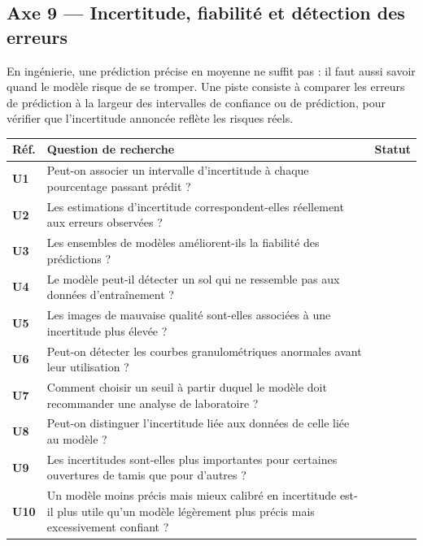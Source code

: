 \documentclass[11pt,a4paper]{article}
\makeatletter
\newenvironment{qtable}{%
  \par\smallskip
  \begin{longtable}{@{}>{\bfseries}p{1.0cm} p{12.3cm} p{1.5cm}@{}}
  \toprule
  \textbf{Réf.} & \textbf{Question de recherche} & \textbf{Statut}\\
  \midrule
  \endhead
}{%
  \bottomrule
  \end{longtable}
}
\makeatother
\begin{document}
\subsection*{Axe 9 --- Incertitude, fiabilité et détection des erreurs}
En ingénierie, une prédiction précise en moyenne ne suffit pas : il faut aussi savoir quand le modèle risque de se tromper. Une piste consiste à comparer les erreurs de prédiction à la largeur des intervalles de confiance ou de prédiction, pour vérifier que l'incertitude annoncée reflète les risques réels.
\begin{qtable}
U1 & Peut-on associer un intervalle d'incertitude à chaque pourcentage passant prédit ? & \\
U2 & Les estimations d'incertitude correspondent-elles réellement aux erreurs observées ? & \\
U3 & Les ensembles de modèles améliorent-ils la fiabilité des prédictions ? & \\
U4 & Le modèle peut-il détecter un sol qui ne ressemble pas aux données d'entraînement ? & \\
U5 & Les images de mauvaise qualité sont-elles associées à une incertitude plus élevée ? & \\
U6 & Peut-on détecter les courbes granulométriques anormales avant leur utilisation ? & \\
U7 & Comment choisir un seuil à partir duquel le modèle doit recommander une analyse de laboratoire ? & \\
U8 & Peut-on distinguer l'incertitude liée aux données de celle liée au modèle ? & \\
U9 & Les incertitudes sont-elles plus importantes pour certaines ouvertures de tamis que pour d'autres ? & \\
U10 & Un modèle moins précis mais mieux calibré en incertitude est-il plus utile qu'un modèle légèrement plus précis mais excessivement confiant ? & \\
\end{qtable}
\end{document}
